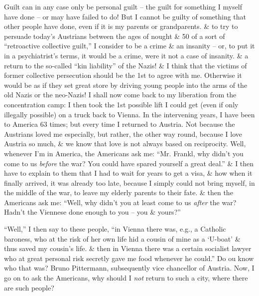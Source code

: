 \documentclass{article}
\numberwithin{equation}{section}
\begin{document}
Guilt can in any case only be personal guilt -- the guilt for something I myself have done -- or may have failed to do! But I cannot be guilty of something that other people have done, even if it is my parents or grandparents. \& to try to persuade today's Austrians between the ages of nought \& 50 of a sort of ``retroactive collective guilt,'' I consider to be a crime \& an insanity -- or, to put it in a psychiatrist's terms, it would be a crime, were it not a case of insanity. \& a return to the so-called ``kin liability'' of the Nazis! \& I think that the victims of former collective persecution should be the 1st to agree with me. Otherwise it would be as if they set great store by driving young people into the arms of the old Nazis or the neo-Nazis! I shall now come back to my liberation from the concentration camp: I then took the 1st possible lift I could get (even if only illegally possible) on a truck back to Vienna. In the intervening years, I have been to America 63 times; but every time I returned to Austria. Not because the Austrians loved me especially, but rather, the other way round, because I love Austria so much, \& we know that love is not always based on reciprocity. Well, whenever I'm in America, the Americans ask me: ``Mr. Frankl, why didn't you come to us \textit{before} the war? You could have spared yourself a great deal.'' \& I then have to explain to them that I had to wait for years to get a visa, \& how when it finally arrived, it was already too late, because I simply could not bring myself, in the middle of the war, to leave my elderly parents to their fate. \& then the Americans ask me: ``Well, why didn't you at least come to us \textit{after} the war? Hadn't the Viennese done enough to you -- you \& yours?''

``Well,'' I then say to these people, ``in Vienna there was, e.g., a Catholic baroness, who at the risk of her own life hid a cousin of mine as a `U-boat' \& thus saved my cousin's life. \& then in Vienna there was a certain socialist lawyer who at great personal risk secretly gave me food whenever he could.'' Do ou know who that was? Bruno Pittermann, subsequently vice chancellor of Austria. Now, I go on to ask the Americans, why should I \textit{not} return to such a city, where there are such people?
\end{document}
